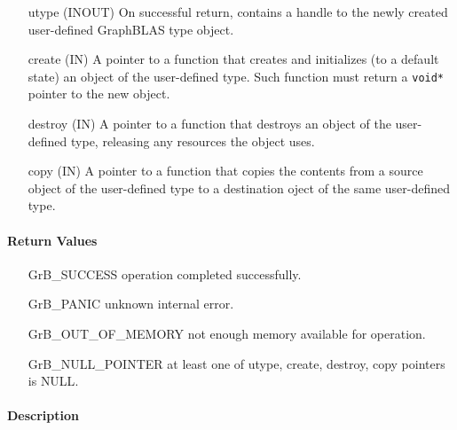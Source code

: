 \begin{itemize}[leftmargin=1.1in]
\item[{\sf utype}] ({\sf INOUT}) On successful return, contains a handle to the newly created user-defined GraphBLAS type object.
\item[{\sf create}] ({\sf IN})    A pointer to a function that creates and initializes (to a default state) an object of the user-defined type. Such function must return a {\tt void*} pointer to the new object.
\item[{\sf destroy}] ({\sf IN}) A pointer to a function that destroys an object of the user-defined type, releasing any resources the object uses.
\item[{\sf copy}] ({\sf IN}) A pointer to a function that copies the contents from a source object of the user-defined type to a destination oject of the same user-defined type.
\end{itemize}

\paragraph{Return Values}

\begin{itemize}[leftmargin=2.1in]
\item[{\sf GrB\_SUCCESS}]           operation completed successfully.
\item[{\sf GrB\_PANIC}]             unknown internal error.
\item[{\sf GrB\_OUT\_OF\_MEMORY}]          not enough memory available for operation.
\item[{\sf GrB\_NULL\_POINTER}]    at least one of {\sf utype}, {\sf create}, {\sf destroy}, {\sf copy} pointers is {\sf NULL}.
\end{itemize}

\paragraph{Description}
